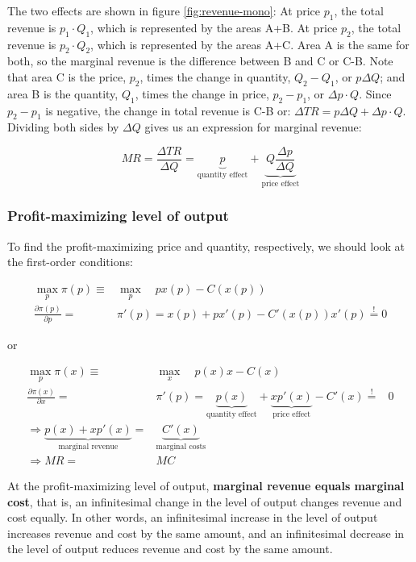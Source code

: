\documentclass[
  12pt,
  oneside]{book}
\theoremstyle{definition}
\theoremstyle{definition}
\theoremstyle{definition}
\theoremstyle{definition}
\theoremstyle{remark}
\begin{document}
The two effects are shown in figure \ref{fig:revenue-mono}: At price \(p_1\), the total revenue is \(p_1 \cdot Q_1\), which is represented by the areas A+B. At price \(p_2\), the total revenue is \(p_2 \cdot Q_2\), which is represented by the areas A+C. Area A is the same for both, so the marginal revenue is the difference between B and C or C-B. Note that area C is the price, \(p_2\), times the change in quantity, \(Q_2 - Q_1\), or \(p \Delta Q\); and area B is the quantity, \(Q_1\), times the change in price, \(p_2 - p_1\), or \(\Delta p \cdot Q\). Since \(p_2 - p_1\) is negative, the change in total revenue is C-B or: \(\Delta TR = p \Delta Q + \Delta p \cdot Q\). Dividing both sides by \(\Delta Q\) gives us an expression for marginal revenue:

\[
MR = \frac{\Delta TR}{\Delta Q} = \underbrace{p}_{\text{quantity effect}} + \underbrace{Q \frac{\Delta p}{\Delta Q}}_{\text{price effect}}
\]

\hypertarget{profit-maximizing-level-of-output}{%
\subsubsection*{Profit-maximizing level of output}\label{profit-maximizing-level-of-output}}

To find the profit-maximizing price and quantity, respectively, we should look at the first-order conditions:

\begin{align*}
\max_{p} \pi (p) \equiv& \max_{p} \quad px(p) - C(x(p))\\
\frac{\partial \pi (p)}{\partial p} =& \pi ' (p) = x(p) + px'(p) - C'(x(p))x'(p) \overset{!}{=} 0
\end{align*}

or

\begin{align*}
\max_{p} \pi (x) \equiv& \max_{x} \quad p(x)x - C(x)\\
\frac{\partial \pi (x)}{\partial x} =& \pi ' (p) = \underbrace{p(x)}_{\text{quantity effect}} + \underbrace{xp'(x)}_{\text{price effect}} - C'(x) \overset{!}{=}& 0\\
\Rightarrow \underbrace{p(x) + xp'(x)}_{\text{marginal revenue}} =& \underbrace{C'(x)}_{\text{marginal costs}}\\
\Rightarrow MR =& MC
\end{align*}

At the profit-maximizing level of output, \textbf{marginal revenue equals marginal cost}, that is, an infinitesimal change in the level of output changes revenue and cost equally. In other words, an infinitesimal increase in the level of output increases revenue and cost by the same amount, and an infinitesimal decrease in the level of output reduces revenue and cost by the same amount.
\end{document}
